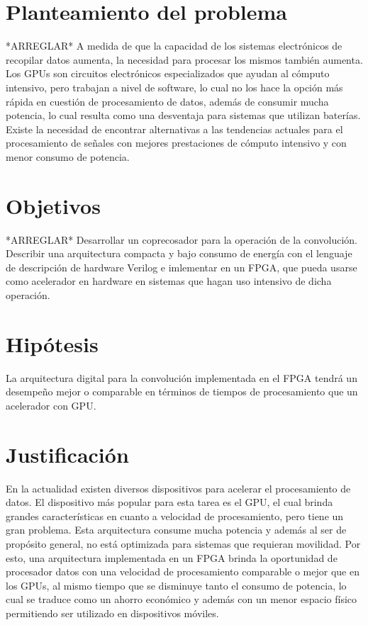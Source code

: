 \section{Planteamiento del problema}
*ARREGLAR* 
A medida de que la capacidad de los sistemas electrónicos de recopilar datos aumenta, la necesidad para procesar los mismos también aumenta. Los GPUs son circuitos electrónicos especializados que ayudan al cómputo intensivo, pero trabajan a nivel de software, lo cual no los hace la opción más rápida en cuestión de procesamiento de datos, además de consumir mucha potencia, lo cual resulta como una desventaja para sistemas que utilizan baterías. Existe la necesidad de encontrar alternativas a las tendencias actuales para el procesamiento de señales con mejores prestaciones de cómputo intensivo y con menor consumo de potencia.\\

\section{Objetivos}
*ARREGLAR* 
Desarrollar un coprecosador para la operación de la convolución. Describir una arquitectura compacta y bajo consumo de energía con el lenguaje de descripción de hardware Verilog e imlementar en un FPGA, que pueda usarse como acelerador en hardware en sistemas que hagan uso intensivo de dicha operación.\\

\section{Hipótesis}
La arquitectura digital para la convolución implementada en el FPGA tendrá un desempeño mejor o comparable en términos de tiempos de procesamiento que un acelerador con GPU. \\


\section{Justificación}
En la actualidad existen diversos dispositivos para acelerar el procesamiento de datos. El dispositivo más popular para esta tarea es el GPU, el cual brinda grandes características en cuanto a velocidad de procesamiento, pero tiene un gran problema. Esta arquitectura consume mucha potencia y además al ser de propósito general, no está optimizada para sistemas que requieran movilidad. Por esto, una arquitectura implementada en un FPGA brinda la oportunidad de procesador datos con una velocidad de procesamiento comparable o mejor que en los GPUs, al mismo tiempo que se disminuye tanto el consumo de potencia, lo cual se traduce como un ahorro económico y además con un menor espacio físico permitiendo ser utilizado en dispositivos móviles.


